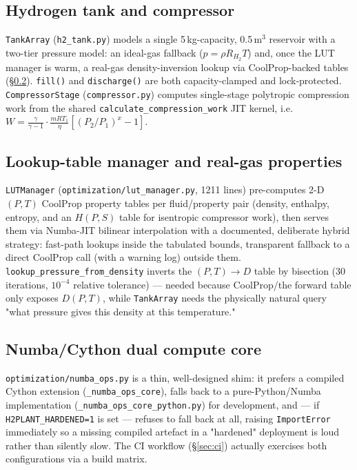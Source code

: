 \documentclass[twocolumn,10pt,a4paper]{article}
\newcommand{\code}[1]{\texttt{\small #1}}
\newcommand{\file}[1]{\texttt{#1}}
\begin{document}
\subsection{Hydrogen tank and compressor}
\code{TankArray} (\file{h2\_tank.py}) models a single 5\,kg-capacity, 0.5\,m$^3$ reservoir with a two-tier pressure model: an ideal-gas fallback ($p = \rho R_{H_2} T$) and, once the LUT manager is warm, a real-gas density-inversion lookup via CoolProp-backed tables (\S\ref{sec:lut}). \code{fill()} and \code{discharge()} are both capacity-clamped and lock-protected. \code{CompressorStage} (\file{compressor.py}) computes single-stage polytropic compression work from the shared \code{calculate\_compression\_work} JIT kernel, i.e.\ $W = \frac{\gamma}{\gamma-1}\cdot\frac{mRT_1}{\eta}\left[(P_2/P_1)^{x}-1\right]$.

\subsection{Lookup-table manager and real-gas properties}
\label{sec:lut}
\code{LUTManager} (\file{optimization/lut\_manager.py}, 1211 lines) pre-computes 2-D $(P,T)$ CoolProp property tables per fluid/property pair (density, enthalpy, entropy, and an $H(P,S)$ table for isentropic compressor work), then serves them via Numba-JIT bilinear interpolation with a documented, deliberate hybrid strategy: fast-path lookups inside the tabulated bounds, transparent fallback to a direct CoolProp call (with a warning log) outside them. \code{lookup\_pressure\_from\_density} inverts the $(P,T)\to D$ table by bisection (30 iterations, $10^{-4}$ relative tolerance) --- needed because CoolProp/the forward table only exposes $D(P,T)$, while \code{TankArray} needs the physically natural query "what pressure gives this density at this temperature."

\subsection{Numba/Cython dual compute core}
\file{optimization/numba\_ops.py} is a thin, well-designed shim: it prefers a compiled Cython extension (\code{\_numba\_ops\_core}), falls back to a pure-Python/Numba implementation (\code{\_numba\_ops\_core\_python.py}) for development, and --- if \code{H2PLANT\_HARDENED=1} is set --- refuses to fall back at all, raising \code{ImportError} immediately so a missing compiled artefact in a "hardened" deployment is loud rather than silently slow. The CI workflow (\S\ref{sec:ci}) actually exercises both configurations via a build matrix.
\end{document}

